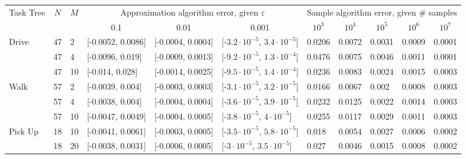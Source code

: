 \documentclass[review]{elsarticle}
\begin{document}
\begin{table}[tbh!]
	{\footnotesize
		\begin{tabular}{|p{0.1cm}|p{0.1cm}|p{0.2cm}|| p{1.05cm}|p{1.05cm}|p{1.4cm}||X{0.6cm}|X{0.6cm}|X{0.6cm}|X{0.6cm}|X{0.6cm}|}
			\hline
			\multicolumn{1}{|c|}{\multirow{2}{*}{Task Tree}} & \multicolumn{1}{c|}{\multirow{2}{*}{$N$}} & \multicolumn{1}{c|}{\multirow{2}{*}{$M$}} & \multicolumn{3}{c|}{Approximation algorithm error, given $\varepsilon$} & \multicolumn{5}{c|}{Sample algorithm error, given \# samples} \\ \cline{4-11} 
			\multicolumn{1}{|c|}{} & \multicolumn{1}{c|}{} & \multicolumn{1}{c|}{} & \multicolumn{1}{c|}{0.1} & \multicolumn{1}{c|}{0.01} & \multicolumn{1}{c|}{0.001} & \multicolumn{1}{c|}{$10^{3}$} & \multicolumn{1}{c|}{$10^{4}$} & \multicolumn{1}{c|}{$10^{5}$} & \multicolumn{1}{c|}{$10^{6}$} & \multicolumn{1}{c|}{$10^{7}$} \\ \hline \hline
			\multirow{3}{*}{Drive} & 47 & 2 & [-0.0052, 0.0086] & [-0.0004, 0.0004] & [-$3.2 {\cdot} 10^{-5}$, $3.4 {\cdot} 10^{-5}$] & 0.0206 & 0.0072 & 0.0031 & 0.0009 & 0.0001 \\ \cline{2-11} 
			& 47 & 4 & [-0.0096, 0.019] & [-0.0009, 0.0013] & [-$9.2 {\cdot} 10^{-5}$, $1.3 {\cdot} 10^{-4}$] & 0.0476 & 0.0075 & 0.0046 & 0.0011 & 0.0001 \\\cline{2-11} 
			& 47 & 10 & [-0.014, 0.028] & [-0.0014, 0.0025] & [-$9.5 {\cdot} 10^{-5}$, $1.4 {\cdot} 10^{-4}$] & 0.0236 & 0.0083 & 0.0024 & 0.0015 & 0.0003 \\ \hline
			\multirow{2}{*}{Walk} & 57 & 2 & [-0.0039, 0.004] & [-0.0003, 0.0003] & [-$3.1 {\cdot} 10^{-5}$, $3.2 {\cdot} 10^{-5}$] & 0.0166 & 0.0067 & 0.002 & 0.0008 & 0.0003 \\ \cline{2-11} 
			& 57 & 4 & [-0.0038, 0.004] & [-0.0004,  0.0004] & [-$3.6 {\cdot} 10^{-5}$, $3.9 {\cdot} 10^{-5}$] & 0.0232 & 0.0125 & 0.0022 & 0.0014 &  0.0003 \\ \cline{2-11} 
			& 57 & 10 & [-0.0047, 0.0049] & [-0.0004, 0.0005] & [-$3.8 {\cdot} 10^{-5}$, $4 {\cdot} 10^{-5}$] & 0.0255 & 0.0117 & 0.0029 & 0.0011  & 0.0003 \\ \hline
			\multirow{2}{*}{Pick Up} & 18 & 10 & {[}-0.0041, 0.0061{]} & {[}-0.0003, 0.0005{]} & {[}-$3.5 {\cdot} 10^{-5}$, $5.8 {\cdot} 10^{-5}${]} & 0.018 & 0.0054 & 0.0027 & 0.0006 & 0.0002 \\ \cline{2-11}
			& 18 & 20 & [-0.0038, 0.0031] & [-0.0006, 0.0005] & [-$3 {\cdot} 10^{-5}$, $3.5 {\cdot} 10^{-5}$] & 0.027 & 0.0046 & 0.0015  & 0.0008 & 0.0002 \\ \hline

\end{tabular}}
\end{table}
\end{document}
